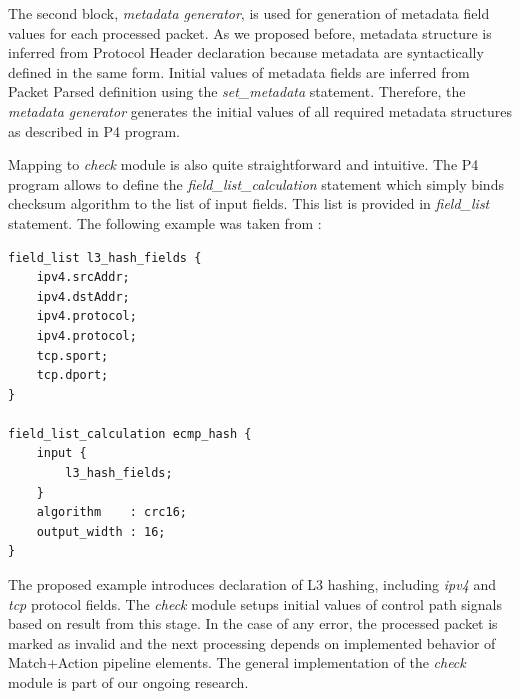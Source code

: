 The second block, \emph{metadata generator}, is used for generation of metadata field values for each processed packet. 
As we proposed before, metadata structure is inferred from Protocol Header declaration because metadata are syntactically defined in the same form. 
Initial values of metadata fields are inferred from Packet Parsed definition using the \textit{set\_metadata} statement. 
Therefore, the \emph{metadata generator} generates the initial values of all required metadata structures as described in P4 program.

Mapping to \emph{check} module is also quite straightforward and intuitive. 
The P4 program allows to define the \textit{field\_list\_calculation} statement which simply binds checksum algorithm to the list of input fields. 
This list is provided in \textit{field\_list} statement. The following example was taken from \cite{p4languagespec}:

\begin{Verbatim}[fontsize=\small]
field_list l3_hash_fields {
    ipv4.srcAddr;
    ipv4.dstAddr;
    ipv4.protocol;
    ipv4.protocol;
    tcp.sport;
    tcp.dport;
}

field_list_calculation ecmp_hash {
    input {
        l3_hash_fields;
    }
    algorithm    : crc16;
    output_width : 16;
}
\end{Verbatim}

The proposed example introduces declaration of L3 hashing, including \textit{ipv4} and \textit{tcp} protocol fields. 
The \emph{check} module setups initial values of control path signals based on result from this stage.
In the case of any error, the processed packet is marked as invalid and the next processing depends on implemented behavior of
Match+Action pipeline elements. 
The general implementation of the \emph{check} module is part of our ongoing research.

